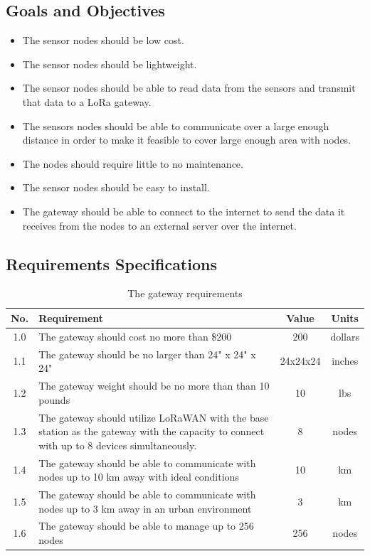 \subsection{Goals and Objectives}
\begin{itemize}
    \item The sensor nodes should be low cost. 
    \item The sensor nodes should be lightweight. 
    \item The sensor nodes should be able to read data from the sensors and transmit that data to a LoRa gateway. 
    \item The sensors nodes should be able to communicate over a large enough distance in order to make it feasible to cover large enough area with nodes.
    \item The nodes should require little to no maintenance.
    \item The sensor nodes should be easy to install.
    \item The gateway should be able to connect to the internet to send the data it receives from the nodes to an external server over the internet.
\end{itemize}


\subsection{Requirements Specifications}
\begin{table}[H]
\centering
\caption{The gateway requirements}
\begin{tabularx}{\linewidth}{|c|X|c|c|}
\hline
No. & Requirement & Value & Units \\
\hline\hline
1.0 & The gateway should cost no more than \$200 & 200 & dollars \\\hline
1.1 & The gateway should be no larger than 24" x 24" x 24" & 24x24x24 & inches \\\hline
1.2 & The gateway weight should be no more than than 10 pounds & 10 & lbs \\\hline
1.3 & The gateway should utilize LoRaWAN with the base station as the gateway with the capacity to connect with up to 8 devices simultaneously. & 8 & nodes \\\hline
1.4 & The gateway should be able to communicate with nodes up to 10 km away with ideal conditions & 10	& km \\\hline
1.5 & The gateway should be able to communicate with nodes up to 3 km away in an urban environment & 3 & km \\\hline
1.6 & The gateway should be able to manage up to 256 nodes & 256 & nodes \\\hline
\end{tabularx}
\label{tab:networkingRequirements}
\end{table}

